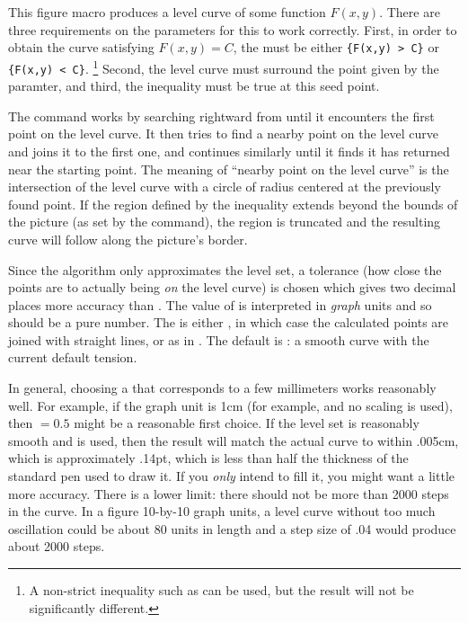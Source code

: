 \documentclass[letterpaper]{article}
\begin{document}
This figure macro produces a level curve of some function $F(x,y)$.
There are three requirements on the parameters for this to work
correctly. First, in order to obtain the curve satisfying $F(x,y) = C$,
the  must be either \verb${F(x,y) > C}$ or
\verb${F(x,y) < C}$.%
   \footnote{A non-strict inequality such as \mfc{>=} can be
    used, but the result will not be significantly different.}
Second, the level curve must surround the point given by the 
paramter, and third, the inequality must be true at this seed point.

The command works by searching rightward from  until it
encounters the first point on the level curve. It then tries to find a
nearby point on the level curve and joins it to the first one, and
continues similarly until it finds it has returned near the starting
point. The meaning of ``nearby point on the level curve'' is the
intersection of the level curve with a circle of radius 
centered at the previously found point. If the region defined by the
inequality extends beyond the bounds of the picture (as set by the
 command), the region is truncated and the resulting curve
will follow along the picture's border.

Since the algorithm only approximates the level set, a tolerance (how
close the points are to actually being \emph{on} the level curve) is
chosen which gives two decimal places more accuracy than .
The value of  is interpreted in \emph{graph} units and
so should be a pure number. The  is either ,
in which case the calculated points are joined with straight lines, or
 as in . The default is
: a smooth curve with the current default tension.

In general, choosing a  that corresponds to a few millimeters
works reasonably well. For example, if the graph unit is 1cm (for
example,  and no scaling is used), then
${}= 0.5$ might be a reasonable first choice. If the level
set is reasonably smooth and  is used, then the result will
match the actual curve to within .005cm, which is approximately .14pt,
which is less than half the thickness of the standard pen used to draw
it. If you \emph{only} intend to fill it, you might want a little more
accuracy. There is a lower limit: there should not be
more than 2000 steps in the curve. In a figure 10-by-10 graph units, a
level curve without too much oscillation could be about 80 units in
length and a step size of .04 would produce about 2000 steps.
\end{document}
